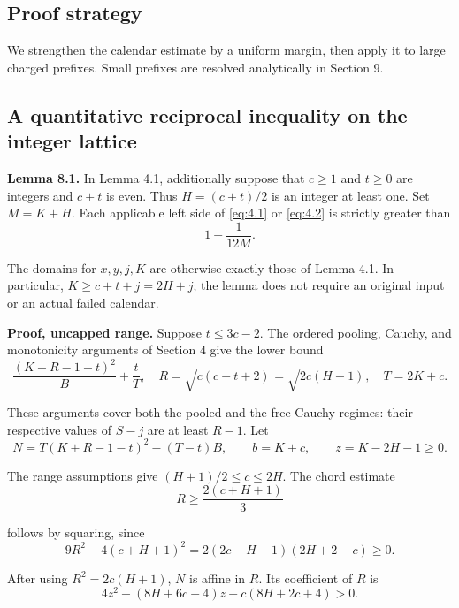 \documentclass[11pt,a4paper]{article}
\begin{document}
\hypertarget{proof-strategy}{%
\subsection{Proof strategy}\label{proof-strategy}}

We strengthen the calendar estimate by a uniform margin, then apply it to large charged prefixes. Small prefixes are resolved analytically in Section 9.

\hypertarget{a-quantitative-reciprocal-inequality-on-the-integer-lattice}{%
\subsection{A quantitative reciprocal inequality on the integer lattice}\label{a-quantitative-reciprocal-inequality-on-the-integer-lattice}}

\textbf{Lemma 8.1.} In Lemma 4.1, additionally suppose that \(c\ge1\) and \(t\ge0\) are integers and \(c+t\) is even. Thus \(H=(c+t)/2\) is an integer at least one. Set \(M=K+H\). Each applicable left side of \eqref{eq:4.1} or \eqref{eq:4.2} is strictly greater than
\begin{equation}
1+\frac1{12M}.
\tag{8.1}
\label{eq:8.1}
\end{equation}

The domains for \(x,y,j,K\) are otherwise exactly those of Lemma 4.1. In particular, \(K\ge c+t+j=2H+j\); the lemma does not require an original input or an actual failed calendar.

\textbf{Proof, uncapped range.} Suppose \(t\le3c-2\). The ordered pooling, Cauchy, and monotonicity arguments of Section 4 give the lower bound
\[
\frac{(K+R-1-t)^2}{B}+\frac tT,
\quad
R=\sqrt{c(c+t+2)}=\sqrt{2c(H+1)},
\quad T=2K+c.
\]

These arguments cover both the pooled and the free Cauchy regimes: their respective values of \(S-j\) are at least \(R-1\). Let
\[
N=T(K+R-1-t)^2-(T-t)B,
\qquad b=K+c,
\qquad z=K-2H-1\ge0.
\]

The range assumptions give \((H+1)/2\le c\le2H\). The chord estimate
\begin{equation}
R\ge\frac{2(c+H+1)}3
\tag{8.2}
\label{eq:8.2}
\end{equation}

follows by squaring, since
\[
9R^2-4(c+H+1)^2
=2(2c-H-1)(2H+2-c)\ge0.
\]

After using \(R^2=2c(H+1)\), \(N\) is affine in \(R\). Its coefficient of \(R\) is
\[
4z^2+(8H+6c+4)z+c(8H+2c+4)>0.
\]
\end{document}
